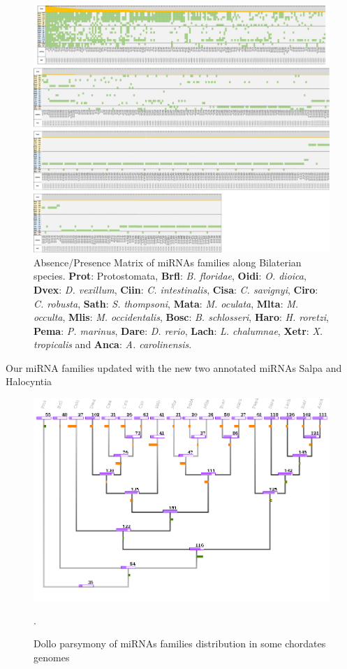 \documentclass[graybox]{svmult}
\begin{document}
\begin{figure}[ht!]
\centering 
\includegraphics[width=\textwidth]{./Images/miRNA_matrix}
\caption{Absence/Presence Matrix of miRNAs families along Bilaterian species. 
\textbf{Prot}: Protostomata, \textbf{Brfl}: \textit{B. floridae}, 
\textbf{Oidi}: \textit{O. dioica}, \textbf{Dvex}: \textit{D. vexillum}, 
\textbf{Ciin}: \textit{C. intestinalis}, \textbf{Cisa}: \textit{C. savignyi}, 
\textbf{Ciro}: \textit{C. robusta}, \textbf{Sath}: \textit{S. thompsoni}, 
\textbf{Mata}: \textit{M. oculata}, \textbf{Mlta}: \textit{M. occulta}, 
\textbf{Mlis}: \textit{M. occidentalis}, \textbf{Bosc}: \textit{B. schlosseri}, 
\textbf{Haro}: \textit{H. roretzi}, \textbf{Pema}: \textit{P. marinus}, 
\textbf{Dare}: \textit{D. rerio}, \textbf{Lach}: \textit{L. chalumnae}, 
\textbf{Xetr}: \textit{X. tropicalis} and \textbf{Anca}: \textit{A. 
carolinensis}. }
\label{fig:matrimirnas}
\end{figure}

Our miRNA families updated with the new two annotated miRNAs Salpa and 
Halocyntia

\begin{figure}[ht!]
\centering
\includegraphics[width=\textwidth]{./Images/last_tree.png}
\caption{Dollo parsymony of miRNAs families distribution in some 
chordates genomes}.
\label{fig:dollotree}
\end{figure}
\end{document}
